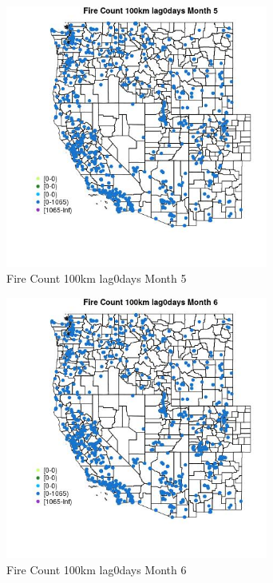 \begin{figure} 
\centering  
\includegraphics[width=0.77\textwidth]{Code_Outputs/Report_ML_input_PM25_Step4_part_f_de_duplicated_aveswNAs_MapObsMo5Fire_Count_100km_lag0days.jpg} 
\caption{\label{fig:Report_ML_input_PM25_Step4_part_f_de_duplicated_aveswNAsMapObsMo5Fire_Count_100km_lag0days}Fire Count 100km lag0days Month 5} 
\end{figure} 
 

\begin{figure} 
\centering  
\includegraphics[width=0.77\textwidth]{Code_Outputs/Report_ML_input_PM25_Step4_part_f_de_duplicated_aveswNAs_MapObsMo6Fire_Count_100km_lag0days.jpg} 
\caption{\label{fig:Report_ML_input_PM25_Step4_part_f_de_duplicated_aveswNAsMapObsMo6Fire_Count_100km_lag0days}Fire Count 100km lag0days Month 6} 
\end{figure} 
 

